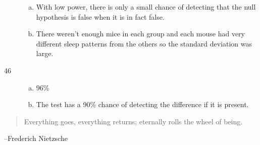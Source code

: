 \documentclass[letterpaper]{exam}
\begin{document}
\begin{description}
\begin{enumerate}[(a)]
          \item With low power, there is only a small chance of detecting that
            the null hypothesis is false when it is in fact false.

          \item There weren't enough mice in each group and each mouse had very
            different sleep patterns from the others so the standard deviation
            was large.

        \end{enumerate}

      \item[46]
        \begin{enumerate}[(a)]
          \item 96\%

          \item The test has a 90\% chance of detecting the difference if it is
            present.
        \end{enumerate}

  \end{description}

  \else
    \vspace{12 cm}
    \begin{quote}
      \begin{em}
        Everything goes, everything returns; eternally rolls the wheel of
        being.
      \end{em}
    \end{quote}
    \hspace{1 cm}--Frederich Nietzsche
  \fi
\end{document}
